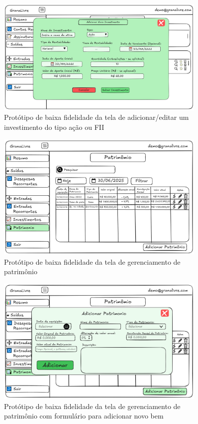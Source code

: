 \begin{figure}[H]
    \centering
    \includegraphics[width=0.9\textwidth]{imgs/08-investimentos8.png}
    \caption{Protótipo de baixa fidelidade da tela de adicionar/editar um investimento do tipo ação ou FII}
    \label{fig:prot_investimentos8}
\end{figure}
\begin{figure}[H]
    \centering
    \includegraphics[width=0.9\textwidth]{imgs/09-patrimonio.png}
    \caption{Protótipo de baixa fidelidade da tela de gerenciamento de patrimônio}
    \label{fig:prot_patrimonio}
\end{figure}

\begin{figure}[H]
    \centering
    \includegraphics[width=0.9\textwidth]{imgs/09-patrimonio2.png}
    \caption{Protótipo de baixa fidelidade da tela de gerenciamento de patrimônio com formulário para adicionar novo bem}
    \label{fig:prot_patrimonio2}
\end{figure}

